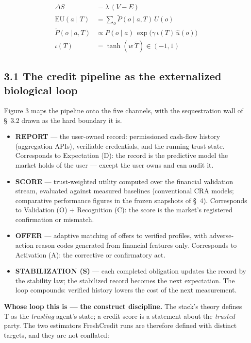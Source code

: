 \documentclass[
]{article}
\begin{document}
\begin{align}
\Delta S &= \lambda\,(V - E) \label{eq:master}\\
\mathrm{EU}(a \mid T) &= \sum_o \tilde{P}(o \mid a, T)\,U(o) \label{eq:eu}\\
\tilde{P}(o \mid a, T) &\propto P(o \mid a)\,\exp\!\big(\gamma\,\iota(T)\,\hat{u}(o)\big) \label{eq:tilt}\\
\iota(T) &= \tanh(w\,\tilde{T}) \in (-1,1) \label{eq:iota}
\end{align}

\subsection{3.1 The credit pipeline as the externalized biological
loop}\label{the-credit-pipeline-as-the-externalized-biological-loop}

Figure 3 maps the pipeline onto the five channels, with the
sequestration wall of §~3.2 drawn as the hard boundary it is.

\begin{itemize}
\item
  \textbf{REPORT} --- the user-owned record: permissioned cash-flow
  history (aggregation APIs), verifiable credentials, and the running
  trust state. Corresponds to Expectation (D): the record is the
  predictive model the market holds of the user --- except the user owns
  and can audit it.
\item
  \textbf{SCORE} --- trust-weighted utility computed over the financial
  validation stream, evaluated against measured baselines (conventional
  CRA models; comparative performance figures in the frozen snapshots of
  §~4). Corresponds to Validation (O) + Recognition (C): the score is
  the market's registered confirmation or mismatch.
\item
  \textbf{OFFER} --- adaptive matching of offers to verified profiles,
  with adverse-action reason codes generated from financial features
  only. Corresponds to Activation (A): the corrective or confirmatory
  act.
\item
  \textbf{STABILIZATION (S)} --- each completed obligation updates the
  record by the stability law; the stabilized record becomes the next
  expectation. The loop compounds: verified history lowers the cost of
  the next measurement.
\end{itemize}

\textbf{Whose loop this is --- the construct discipline.} The stack's
theory defines T as the \emph{trusting} agent's state; a credit score is
a statement about the \emph{trusted} party. The two estimators
FreshCredit runs are therefore defined with distinct targets, and they
are not conflated:
\end{document}
